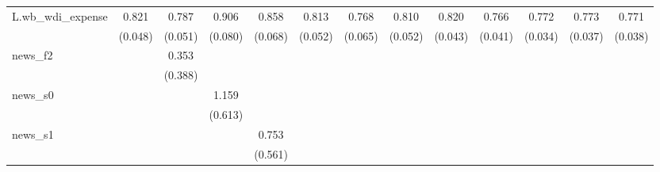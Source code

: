 {\begin{tabular}{l*{12}{c}}
\addlinespace
L.wb\_wdi\_expense&       0.821\sym{***}&       0.787\sym{***}&       0.906\sym{***}&       0.858\sym{***}&       0.813\sym{***}&       0.768\sym{***}&       0.810\sym{***}&       0.820\sym{***}&       0.766\sym{***}&       0.772\sym{***}&       0.773\sym{***}&       0.771\sym{***}\\
            &     (0.048)         &     (0.051)         &     (0.080)         &     (0.068)         &     (0.052)         &     (0.065)         &     (0.052)         &     (0.043)         &     (0.041)         &     (0.034)         &     (0.037)         &     (0.038)         \\
\addlinespace
news\_f2     &                     &       0.353         &                     &                     &                     &                     &                     &                     &                     &                     &                     &                     \\
            &                     &     (0.388)         &                     &                     &                     &                     &                     &                     &                     &                     &                     &                     \\
\addlinespace
news\_s0     &                     &                     &       1.159\sym{*}  &                     &                     &                     &                     &                     &                     &                     &                     &                     \\
            &                     &                     &     (0.613)         &                     &                     &                     &                     &                     &                     &                     &                     &                     \\
\addlinespace
news\_s1     &                     &                     &                     &       0.753         &                     &                     &                     &                     &                     &                     &                     &                     \\
            &                     &                     &                     &     (0.561)         &                     &                     &                     &                     &                     &                     &                     &                     \\

\end{tabular}}
